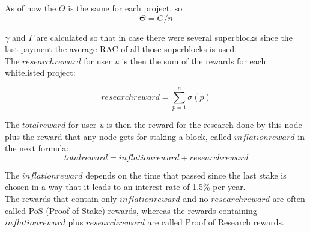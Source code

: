 As of now the $\Theta$ is the same for each project, so
\[ \Theta = G/n \]

$\gamma$ and $\Gamma$ are calculated so that in case there were several superblocks since the last payment the average RAC of all those superblocks is used.\\

The $researchreward$ for user \textit{u} is then the sum of the rewards for each whitelisted project:

\[ researchreward = \sum_{p=1}^{n} \sigma(p) \]


The $totalreward$  for user \textit{u} is then the reward for the research done by this node plus the reward that any node gets for staking a block, called $inflationreward$ in the next formula:
\[ totalreward = inflationreward +  researchreward \]

The $inflationreward$ depends on the time that passed since the last stake is chosen in a way that it leads to an interest rate of 1.5\% per year.\\

The rewards that contain only $inflationreward$ and no $researchreward$
are often called PoS (Proof of Stake) rewards, whereas the rewards containing $inflationreward$ plus $researchreward$ are called Proof of Research rewards.
